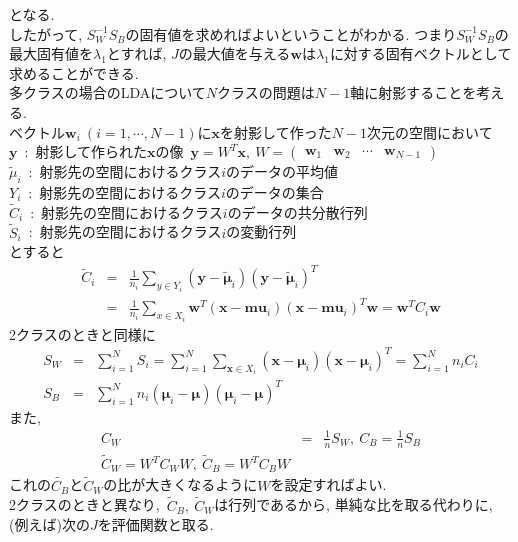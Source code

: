 \documentclass[dvipdfmx,a4j]{jsarticle}
\begin{document}
  となる.\\
  したがって, $S_{W}^{-1}S_{B}$の固有値を求めればよいということがわかる. つまり$S_{W}^{-1}S_{B}$の最大固有値を$\lambda_{1}$とすれば, $J$の最大値を与える$\bm{w}$は$\lambda_{1}$に対する固有ベクトルとして求めることができる.\\[1cm]
  多クラスの場合のLDAについて$N$クラスの問題は$N-1$軸に射影することを考える.\\
  ベクトル$\bm{w}_{i}\ (i=1,\cdots,N-1)$に$\bm{x}$を射影して作った$N-1$次元の空間において\\
  $\bm{y}$\ :\ 射影して作られた$\bm{x}$の像\ $\bm{y}=W^{T}\bm{x},\ W=\begin{pmatrix}\bm{w}_{1}&\bm{w}_{2}&\cdots&\bm{w}_{N-1}\end{pmatrix}$\\
  $\tilde{\mu}_{i}$\ :\ 射影先の空間におけるクラス$i$のデータの平均値\\
  $Y_{i}$\ :\ 射影先の空間におけるクラス$i$のデータの集合\\
  $\tilde{C}_{i}$\ :\ 射影先の空間におけるクラス$i$のデータの共分散行列\\
  $\tilde{S}_{i}$\ :\ 射影先の空間におけるクラス$i$の変動行列\\
  とすると
  \begin{eqnarray*}
    \tilde{C}_{i}&=&\frac{1}{n_{i}}\sum_{y\in Y_{i}}(\bm{y}-\tilde{\bm{\mu}}_{i})(\bm{y}-\tilde{\bm{\mu}}_{i})^{T}\\
                 &=&\frac{1}{n_{i}}\sum_{x\in X_{i}}\bm{w}^{T}(\bm{x}-\bm{mu}_{i})(\bm{x}-\bm{mu}_{i})^{T}\bm{w}=\bm{w}^{T}C_{i}\bm{w}
  \end{eqnarray*}
  2クラスのときと同様に
  \begin{eqnarray*}
    S_{W}&=&\sum_{i=1}^{N}S_{i}=\sum_{i=1}^{N}\sum_{\bm{x}\in X_{i}}(\bm{x}-\bm{\mu}_{i})(\bm{x}-\bm{\mu}_{i})^{T}=\sum_{i=1}^{N}n_{i}C_{i}\\
    S_{B}&=&\sum_{i=1}^{N}n_{i}(\bm{\mu}_{i}-\bm{\mu})(\bm{\mu}_{i}-\bm{\mu})^{T}
  \end{eqnarray*}
  また,
  \begin{eqnarray*}
    C_{W}&=&\frac{1}{n}S_{W},\ C_{B}=\frac{1}{n}S_{B}\\
    \tilde{C}_{W}=W^{T}C_{W}W,\ \tilde{C}_{B}=W^{T}C_{B}W
  \end{eqnarray*}
  これの$\tilde{C_{B}}$と$\tilde{C}_{W}$の比が大きくなるように$W$を設定すればよい.\\
  2クラスのときと異なり,\ $\tilde{C}_{B},\ \tilde{C}_{W}$は行列であるから, 単純な比を取る代わりに, (例えば)次の$J$を評価関数と取る.
\end{document}
